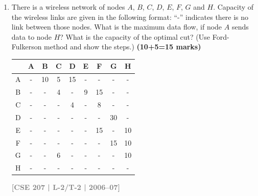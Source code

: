 \documentclass[12pt]{article}
\newcommand{\yr}[1]{\hfill\textcolor{gray}{\small\textbf{[#1]}}}
\newcommand{\mk}[1]{\textcolor{orange!70!black}{\small\textbf{(#1 marks)}}}
\begin{document}
\begin{enumerate}
\begin{center}
    \end{center}
    \mk{20} \yr{CSE 207 | L-2/T-2 | 2007--08}


  \item There is a wireless network of nodes $A$, $B$, $C$, $D$, $E$, $F$, $G$ and $H$. Capacity of the wireless links are given in the following format: ``-'' indicates there is no link between those nodes. What is the maximum data flow, if node $A$ sends data to node $H$? What is the capacity of the optimal cut? (Use Ford-Fulkerson method and show the steps.) \mk{10+5=15}

    \begin{center}
      \begin{tabular}{ccccccccc}
        \toprule
        & A  & B  & C & D & E  & F  & G  & H \\
        \midrule
        A & -  & 10 & 5 & 15 & - & -  & -  & - \\
        B & -  & -  & 4 & -  & 9 & 15 & -  & - \\
        C & -  & -  & - & 4  & - & 8  & -  & - \\
        D & -  & -  & - & -  & - & -  & 30 & - \\
        E & -  & -  & - & -  & - & 15 & -  & 10 \\
        F & -  & -  & - & -  & - & -  & 15 & 10 \\
        G & -  & -  & 6 & -  & - & -  & -  & 10 \\
        H & -  & -  & - & -  & - & -  & -  & - \\
        \bottomrule
      \end{tabular}
    \end{center}
    \yr{CSE 207 | L-2/T-2 | 2006--07}


\end{enumerate}
\end{document}
